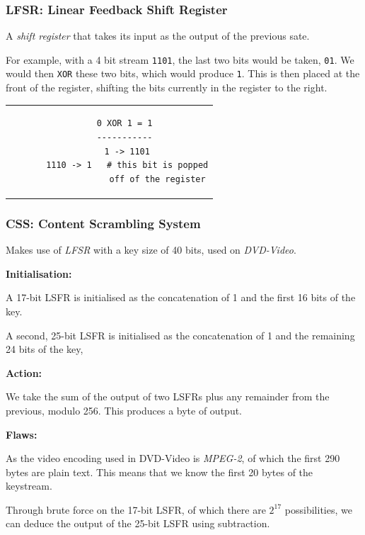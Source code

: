 \documentclass{article}
\begin{document}
\subsubsection{LFSR: Linear Feedback Shift Register}

A \textit{shift register} that takes its input as the output of the previous sate.

For example, with a 4 bit stream \texttt{1101}, the last two bits would be taken, \texttt{01}. We would then \texttt{XOR} these two bits, which would produce \texttt{1}. This is then placed at the front of the register, shifting the bits currently in the register to the right.

\begin{center}
  \begin{tabular}{c}
    \begin{lstlisting}
      0 XOR 1 = 1
      -----------
       1 -> 1101
       1110 -> 1   # this bit is popped
                   off of the register
    \end{lstlisting}
  \end{tabular}
\end{center}

\filbreak
\subsubsection{CSS: Content Scrambling System}

Makes use of \textit{LFSR} with a key size of 40 bits, used on \textit{DVD-Video}.

\textbf{Initialisation:}

A 17-bit LSFR is initialised as the concatenation of 1 and the first 16 bits of the key.

A second, 25-bit LSFR is initialised as the concatenation of 1 and the remaining 24 bits of the key,

\textbf{Action:}

We take the sum of the output of two LSFRs plus any remainder from the previous, modulo 256. This produces a byte of output.

\textbf{Flaws:}

As the video encoding used in DVD-Video is \textit{MPEG-2}, of which the first 290 bytes are plain text. This means that we know the first 20 bytes of the keystream.

Through brute force on the 17-bit LSFR, of which there are $2^{17}$ possibilities, we can deduce the output of the 25-bit LSFR using subtraction.
\end{document}
